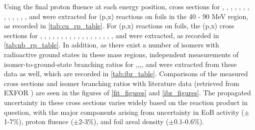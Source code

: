 \documentclass[3p]{elsarticle}
\begin{document}
Using the final proton fluence at each energy position, cross sections for  ,  , , , , , , ,  , , , , , and  were extracted for (p,x) reactions  on  foils in the 40 - 90 MeV region, as recorded in \autoref{tab:cu_rp_table}.
For  (p,x) reactions on  foils, the (p,x) cross sections for , , , , , , , , , , , , , , , , , , and  were extracted, as recorded in \autoref{tab:nb_rp_table}.
In addition, as there exist a number of isomers with radioactive ground states in these mass regions,  independent measurements of isomer-to-ground-state branching ratios for ,,,, and  were  extracted from these data as well, which are recorded in \autoref{tab:ibr_table}.
Comparisons  of the measured cross sections and isomer branching ratios with literature data (retrieved from EXFOR \cite{Otuka2014272}) are seen in the figures of \ref{fit_figures} and \ref{ibr_figures}.
The propagated uncertainty in these cross sections varies widely based on the reaction product in question, with the major components  arising from uncertainty in EoB activity ($\pm$1-7\%), proton fluence ($\pm$2-3\%), and foil areal density ($\pm$0.1-0.6\%).
\end{document}
